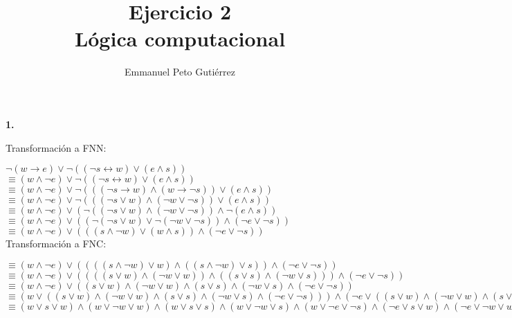 \documentclass{article}
\title{Ejercicio 2\\Lógica computacional}
\author{Emmanuel Peto Gutiérrez}
\begin{document}
\maketitle

\textbf{1.}

Transformación a FNN:

$\lnot (w \rightarrow e) \lor  \lnot (( \lnot s \leftrightarrow w) \lor (e \land s))$\\
$\equiv (w \land  \lnot e) \lor  \lnot (( \lnot s \leftrightarrow w) \lor (e \land s))$\\
$\equiv (w \land  \lnot e) \lor  \lnot ((( \lnot s \rightarrow w) \land (w \rightarrow  \lnot s)) \lor (e \land s))$\\
$\equiv (w \land  \lnot e) \lor  \lnot ((( \lnot s \lor w) \land ( \lnot w \lor  \lnot s)) \lor (e \land s))$\\
$\equiv (w \land  \lnot e) \lor ( \lnot (( \lnot s \lor w)  \land  ( \lnot w \lor  \lnot s))  \land   \lnot (e \land s))$\\
$\equiv (w \land  \lnot e) \lor (( \lnot ( \lnot s \lor w) \lor  \lnot ( \lnot w \lor \lnot s))  \land  ( \lnot e \lor  \lnot s))$\\
$\equiv (w \land  \lnot e) \lor (((s \land  \lnot w) \lor (w \land s))  \land  ( \lnot e \lor \lnot s))$\\

Transformación a FNC:

$\equiv (w \land  \lnot e) \lor ((((s \land  \lnot w) \lor w)  \land  ((s \land  \lnot w) \lor s))  \land  ( \lnot e \lor  \lnot s))$\\
$\equiv (w \land  \lnot e) \lor ((((s \lor w)  \land  ( \lnot w \lor w))  \land  ((s \lor s)  \land  ( \lnot w \lor s)))  \land  ( \lnot e \lor  \lnot s))$\\
$\equiv (w \land  \lnot e) \lor ((s \lor w)  \land  ( \lnot w \lor w)  \land  (s \lor s)  \land  ( \lnot w \lor s)  \land  ( \lnot e \lor  \lnot s))$\\
$\equiv (w \lor ((s \lor w)  \land  ( \lnot w \lor w)  \land  (s \lor s)  \land  ( \lnot w \lor s)  \land  ( \lnot e \lor  \lnot s)))  \land  ( \lnot e \lor ((s \lor w)  \land  ( \lnot w \lor w)  \land  (s \lor s)  \land  ( \lnot w \lor s)  \land  ( \lnot e \lor  \lnot s)))$\\
$\equiv (w \lor s \lor w)  \land  (w \lor  \lnot w \lor w)  \land  (w \lor s \lor s)  \land  (w \lor  \lnot w \lor s)  \land  (w \lor  \lnot e \lor  \lnot s)  \land  ( \lnot e \lor s \lor w)  \land  ( \lnot e \lor  \lnot w \lor w)  \land  ( \lnot e \lor s \lor s)  \land  ( \lnot e \lor  \lnot w \lor s)  \land  ( \lnot e \lor  \lnot e \lor  \lnot s)$\\
\end{document}

